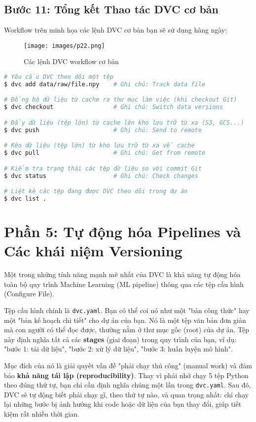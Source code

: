 \documentclass[11pt]{article}
\begin{document}
\subsection{Bước 11: Tổng kết Thao tác DVC cơ bản}
Workflow trên minh họa các lệnh DVC cơ bản bạn sẽ sử dụng hàng ngày:

\begin{figure}[H]
    \centering
    \texttt{[image: images/p22.png]}
    \caption{Các lệnh DVC workflow cơ bản}
\end{figure}

\begin{lstlisting}[language=bash, commentstyle=\color{gray}]
# Yêu cầu DVC theo dõi một tệp
$ dvc add data/raw/file.npy    # Ghi chú: Track data file

# Đồng bộ dữ liệu từ cache ra thư mục làm việc (khi checkout Git)
$ dvc checkout                 # Ghi chú: Switch data versions

# Đẩy dữ liệu (tệp lớn) từ cache lên kho lưu trữ từ xa (S3, GCS...)
$ dvc push                     # Ghi chú: Send to remote

# Kéo dữ liệu (tệp lớn) từ kho lưu trữ từ xa về cache
$ dvc pull                     # Ghi chú: Get from remote

# Kiểm tra trạng thái các tệp dữ liệu so với commit Git
$ dvc status                   # Ghi chú: Check changes

# Liệt kê các tệp đang được DVC theo dõi trong dự án
$ dvc list .
\end{lstlisting}

\section{Phần 5: Tự động hóa Pipelines và Các khái niệm Versioning}
Một trong những tính năng mạnh mẽ nhất của DVC là khả năng tự động hóa toàn bộ quy trình Machine Learning (ML pipeline) thông qua các tệp cấu hình (Configure File).

Tệp cấu hình chính là \texttt{dvc.yaml}. Bạn có thể coi nó như một "bản công thức" hay một "bản kế hoạch chi tiết" cho dự án của bạn. Nó là một tệp văn bản đơn giản mà con người có thể đọc được, thường nằm ở thư mục gốc (root) của dự án. Tệp này định nghĩa tất cả các \textbf{stages} (giai đoạn) trong quy trình của bạn, ví dụ: "bước 1: tải dữ liệu", "bước 2: xử lý dữ liệu", "bước 3: huấn luyện mô hình".

Mục đích của nó là giải quyết vấn đề "phải chạy thủ công" (manual work) và đảm bảo \textbf{khả năng tái lập (reproducibility)}. Thay vì phải nhớ chạy 5 tệp Python theo đúng thứ tự, bạn chỉ cần định nghĩa chúng một lần trong \texttt{dvc.yaml}. Sau đó, DVC sẽ tự động biết phải chạy gì, theo thứ tự nào, và quan trọng nhất: chỉ chạy lại những bước bị ảnh hưởng khi code hoặc dữ liệu của bạn thay đổi, giúp tiết kiệm rất nhiều thời gian.
\end{document}
